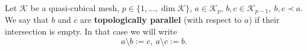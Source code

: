 \begin{definition}
  Let $\mathcal{K}$ be a quasi-cubical mesh,
    $p \in \{1, ..., \dim \mathcal{K}\}$,
    $a \in \mathcal{K}_p$,
    $b, c \in \mathcal{K}_{p - 1},\ b, c \prec a$.
  We say that $b$ and $c$ are \textbf{topologically parallel} (with respect to
  $a$) if their intersection is empty.
  In that case we will write
  \begin{equation}
    a \setminus b := c,\ a \setminus c := b.
  \end{equation}
\end{definition}

